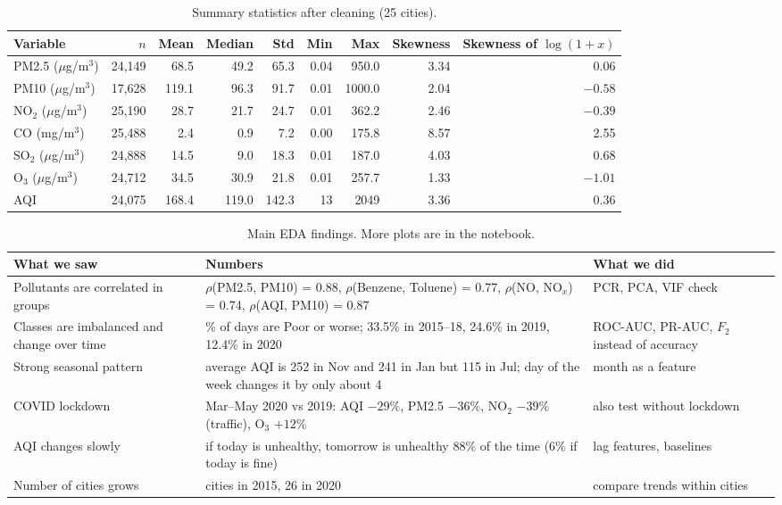 \documentclass[10pt,a4paper]{article}
\begin{document}
\begin{table}[!htb]\centering\footnotesize\setlength{\tabcolsep}{5pt}
\begin{tabular}{lrrrrrrrr}\toprule
Variable & $n$ & Mean & Median & Std & Min & Max & Skewness & Skewness of $\log(1+x)$\\\midrule
PM2.5 ($\mu$g/m$^3$) & 24{,}149 & 68.5 & 49.2 & 65.3 & 0.04 & 950.0 & 3.34 & 0.06\\
PM10 ($\mu$g/m$^3$) & 17{,}628 & 119.1 & 96.3 & 91.7 & 0.01 & 1000.0 & 2.04 & $-0.58$\\
NO$_2$ ($\mu$g/m$^3$) & 25{,}190 & 28.7 & 21.7 & 24.7 & 0.01 & 362.2 & 2.46 & $-0.39$\\
CO (mg/m$^3$) & 25{,}488 & 2.4 & 0.9 & 7.2 & 0.00 & 175.8 & 8.57 & 2.55\\
SO$_2$ ($\mu$g/m$^3$) & 24{,}888 & 14.5 & 9.0 & 18.3 & 0.01 & 187.0 & 4.03 & 0.68\\
O$_3$ ($\mu$g/m$^3$) & 24{,}712 & 34.5 & 30.9 & 21.8 & 0.01 & 257.7 & 1.33 & $-1.01$\\
AQI & 24{,}075 & 168.4 & 119.0 & 142.3 & 13 & 2049 & 3.36 & 0.36\\\bottomrule
\end{tabular}
\caption{Summary statistics after cleaning (25 cities).}\label{tab:stats}
\end{table}

\begin{table}[!htb]\centering\small
\begin{tabular}{>{\raggedright\arraybackslash}p{3.4cm}>{\raggedright\arraybackslash}p{8.6cm}>{\raggedright\arraybackslash}p{3.6cm}}\toprule
What we saw & Numbers & What we did\\\midrule
Pollutants are correlated in groups & $\rho$(PM2.5, PM10) = 0.88, $\rho$(Benzene, Toluene) = 0.77, $\rho$(NO, NO$_x$) = 0.74, $\rho$(AQI, PM10) = 0.87 & PCR, PCA, VIF check\\
Classes are imbalanced and change over time & 26.7\% of days are Poor or worse; 33.5\% in 2015--18, 24.6\% in 2019, 12.4\% in 2020 & ROC-AUC, PR-AUC, $F_2$ instead of accuracy\\
Strong seasonal pattern & average AQI is 252 in Nov and 241 in Jan but 115 in Jul; day of the week changes it by only about 4 & month as a feature\\
COVID lockdown & Mar--May 2020 vs 2019: AQI $-29\%$, PM2.5 $-36\%$, NO$_2$ $-39\%$ (traffic), O$_3$ $+12\%$ & also test without lockdown\\
AQI changes slowly & if today is unhealthy, tomorrow is unhealthy 88\% of the time (6\% if today is fine) & lag features, baselines\\
Number of cities grows & 7 cities in 2015, 26 in 2020 & compare trends within cities\\\bottomrule
\end{tabular}
\caption{Main EDA findings. More plots are in the notebook.}\label{tab:eda}
\end{table}
\end{document}
